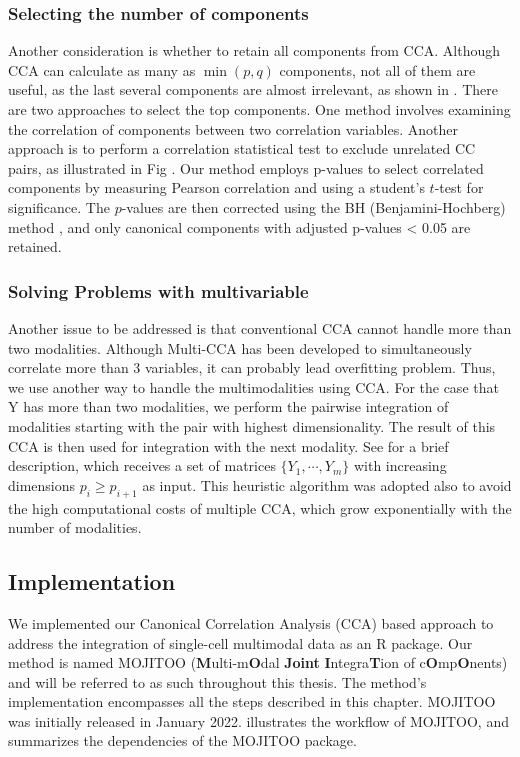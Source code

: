 \subsubsection{Selecting the number of components}
Another consideration is whether to retain all components from CCA. Although CCA can calculate as many as $\min(p, q)$ components, not all of them are useful, as the last several components are almost irrelevant, as shown in . There are two approaches to select the top components. One method involves examining the correlation of components between two correlation variables. Another approach is to perform a correlation statistical test to exclude unrelated CC pairs, as illustrated in Fig . Our method employs p-values to select correlated components by measuring Pearson correlation and using a student's $t$-test for significance. The $p$-values are then corrected using the BH (Benjamini-Hochberg) method \cite{benjamini1995controlling}, and only canonical components with adjusted p-values < 0.05 are retained.

\subsubsection{Solving Problems with multivariable}
Another issue to be addressed is that conventional CCA cannot handle more than two modalities. Although Multi-CCA has been developed to simultaneously correlate more than 3 variables, it can probably lead overfitting problem. Thus, we use another way to handle the multimodalities using CCA. For the case that Y has more than two modalities, we perform the pairwise integration of modalities starting with the pair with highest dimensionality. The result of this CCA is then used for integration
with the next modality. See  for a brief description, which receives a set of matrices $\{Y_{1},\cdots, Y_{m}\}$ with increasing dimensions $p_{i}\geq p_{i+1}$ as input. This heuristic algorithm was adopted also to avoid the high computational costs of multiple CCA, which grow exponentially with the number of modalities. 

\subsection{Implementation}
\label{methods:integration:imp}
We implemented our Canonical Correlation Analysis (CCA) based approach to address the integration of single-cell multimodal data as an R package. Our method is named MOJITOO (\textbf{M}ulti-m\textbf{O}dal \textbf{Joint} \textbf{I}ntegra\textbf{T}ion of c\textbf{O}mp\textbf{O}nents) and will be referred to as such throughout this thesis. The method's implementation encompasses all the steps described in this chapter. MOJITOO was initially released in January 2022.  illustrates the workflow of MOJITOO, and  summarizes the dependencies of the MOJITOO package.

